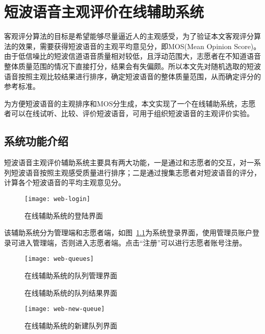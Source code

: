 \chapter{短波语音主观评价在线辅助系统} \label{chapter:web}


客观评分算法的目标是希望能够尽量逼近人的主观感受，为了验证本文客观评分算法的效果，需要获得短波语音的主观平均意见分，即MOS(Mean Opinion Score)。由于低信噪比的短波信道语音质量相对较低，且浮动范围大，志愿者在不知道语音整体质量范围的情况下直接打分，结果会有失偏颇。所以本文先对随机选取的短波语音按照主观比较结果进行排序，确定短波语音的整体质量范围，从而确定评分的参考标准。

为方便短波语音的主观排序和MOS分生成，本文实现了一个在线辅助系统，志愿者可以在线试听、比较、评价短波语音，可用于组织短波语音的主观评价实验。

\section{系统功能介绍}

短波语音主观评价辅助系统主要具有两大功能，一是通过和志愿者的交互，对一系列短波语音按照主观感受质量进行排序；二是通过搜集志愿者对短波语音的评分，计算各个短波语音的平均主观意见分。

\begin{figure}
\centering
\texttt{[image: web-login]}
\caption{在线辅助系统的登陆界面\label{fig:web-login}}
\end{figure}

该辅助系统分为管理端和志愿者端，如图~\ref{fig:web-login}为系统登录界面，使用管理员账户登录可进入管理端，否则进入志愿者端。点击“注册”可以进行志愿者账号注册。

\begin{figure}
\centering
\texttt{[image: web-queues]}
\caption{在线辅助系统的队列管理界面\label{fig:web-queues}}
\end{figure}

\begin{figure}
\centering
{}
\caption{在线辅助系统的队列结果界面\label{fig:web-result}}
\end{figure}

\begin{figure}
\centering
\texttt{[image: web-new-queue]}
\caption{在线辅助系统的新建队列界面\label{fig:web-new-queue}}
\end{figure}

